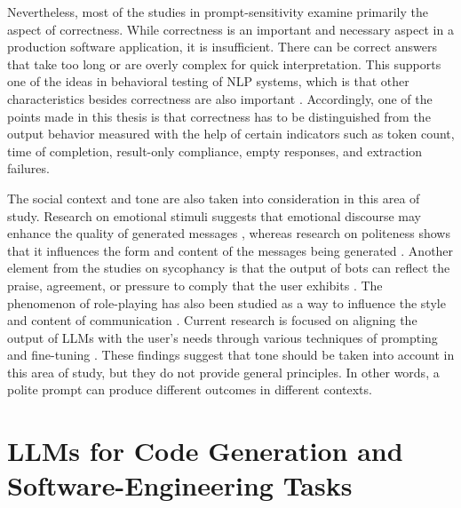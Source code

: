 Nevertheless, most of the studies in prompt-sensitivity examine primarily the aspect of correctness. While correctness is an important and necessary aspect in a production software application, it is insufficient. There can be correct answers that take too long or are overly complex for quick interpretation. This supports one of the ideas in behavioral testing of NLP systems, which is that other characteristics besides correctness are also important \cite{ribeiro2020checklist}. Accordingly, one of the points made in this thesis is that correctness has to be distinguished from the output behavior measured with the help of certain indicators such as token count, time of completion, result-only compliance, empty responses, and extraction failures.

The social context and tone are also taken into consideration in this area of study. Research on emotional stimuli suggests that emotional discourse may enhance the quality of generated messages \cite{li2023emotionprompt}, whereas research on politeness shows that it influences the form and content of the messages being generated \cite{yin2024politeness}. Another element from the studies on sycophancy is that the output of bots can reflect the praise, agreement, or pressure to comply that the user exhibits \cite{sharma2023sycophancy}. The phenomenon of role-playing has also been studied as a way to influence the style and content of communication \cite{shanahan2023roleplay}. Current research is focused on aligning the output of LLMs with the user’s needs through various techniques of prompting and fine-tuning \cite{shen2023alignment}. These findings suggest that tone should be taken into account in this area of study, but they do not provide general principles. In other words, a polite prompt can produce different outcomes in different contexts.

\section{LLMs for Code Generation and Software-Engineering Tasks}

